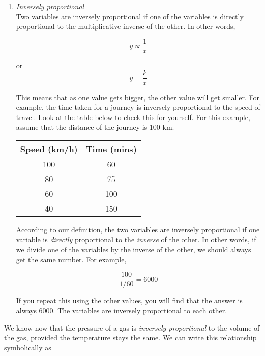 {\begin{enumerate}
\item{\textit{Inversely proportional\\}
Two variables are inversely proportional if one of the variables is directly proportional to the multiplicative inverse of the other. In other words, 

\begin{equation*}
y \propto \frac{1}{x}   
\end{equation*}

or \begin{equation*}
y = \frac{k}{x}
\end{equation*}

This means that as one value gets bigger, the other value will get smaller. For example, the time taken for a journey is inversely proportional to the speed of travel. Look at the table below to check this for yourself. For this example, assume that the distance of the journey is 100 km.

\begin{center}
\begin{tabular}{|c|c|}\hline
\textbf{Speed} (km/h) & \textbf{Time} (mins) \\\hline
100 & 60 \\\hline
80 & 75 \\\hline
60 & 100 \\\hline
40 & 150 \\\hline
\end{tabular}
\end{center}

According to our definition, the two variables are inversely proportional if one variable is \textit{directly} proportional to the \textit{inverse} of the other. In other words, if we divide one of the variables by the inverse of the other, we should always get the same number. For example, 

\begin{equation*}
\frac{100}{1/60} = 6000
\end{equation*}

If you repeat this using the other values, you will find that the answer is always 6000. The variables are inversely proportional to each other. 
}
 

\end{enumerate}

}

We know now that the pressure of a gas is \textit{inversely proportional} to the volume of the gas, provided the temperature stays the same. We can write this relationship symbolically as

